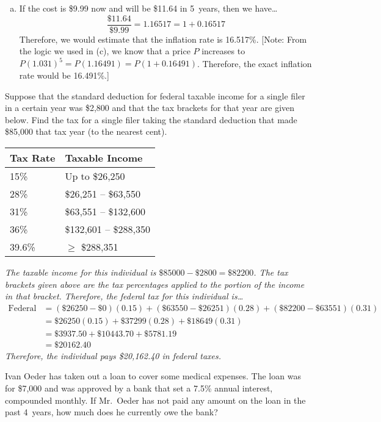 \documentclass[12pt,letterpaper]{exam}
\begin{document}
\begin{questions}
{\begin{enumerate}[(a)]
\item If the cost is \$9.99 now and will be \$11.64 in 5~years, then we have\dots
	\[
	\dfrac{\$11.64}{\$9.99}= 1.16517= 1 + 0.16517
	\]
Therefore, we would estimate that the inflation rate is 16.517\%. [Note: From the logic we used in (c), we know that a price $P$ increases to $P(1.031)^5= P(1.16491)= P(1 + 0.16491)$. Therefore, the exact inflation rate would be 16.491\%.]
\end{enumerate}
}



\newpage
\question[15] Suppose that the standard deduction for federal taxable income for a single filer in a certain year was \$2,800 and that the tax brackets for that year are given below. Find the tax for a single filer taking the standard deduction that made \$85,000 that tax year (to the nearest cent). \par
	\begin{table}[!ht]
	\centering
	\begin{tabular}{|l|l|} \hline
	Tax Rate & Taxable Income \\ \hline \hline
	15\% & Up to \$26,250 \\ \hline
	28\% & \$26,251 -- \$63,550 \\ \hline
	31\% & \$63,551 -- \$132,600 \\ \hline
	36\% & \$132,601 -- \$288,350 \\ \hline
	39.6\% & $\geq$ \$288,351 \\ \hline
	\end{tabular}
	\end{table} \pspace

{\itshape
\sol The taxable income for this individual is $\$85000 - \$2800= \$82200$. The tax brackets given above are the tax percentages applied to the portion of the income in that bracket. Therefore, the federal tax for this individual is\dots
	\[
	\begin{aligned}
	\text{Federal Tax}&= (\$26250 - \$0)(0.15) + (\$63550 - \$26251)(0.28) + (\$82200 - \$63551)(0.31) \\[0.3cm]
	&= \$26250(0.15) + \$37299(0.28) + \$18649(0.31) \\[0.3cm]
	&= \$3937.50 + \$10443.70 + \$5781.19 \\[0.3cm]
	&= \$20162.40
	\end{aligned}
	\]
Therefore, the individual pays \$20,162.40 in federal taxes.
}



\newpage
\question[10] Ivan Oeder has taken out a loan to cover some medical expenses. The loan was for \$7,000 and was approved by a bank that set a 7.5\% annual interest, compounded monthly. If Mr.~Oeder has not paid any amount on the loan in the past 4~years, how much does he currently owe the bank? \pspace


\end{questions}
\end{document}
